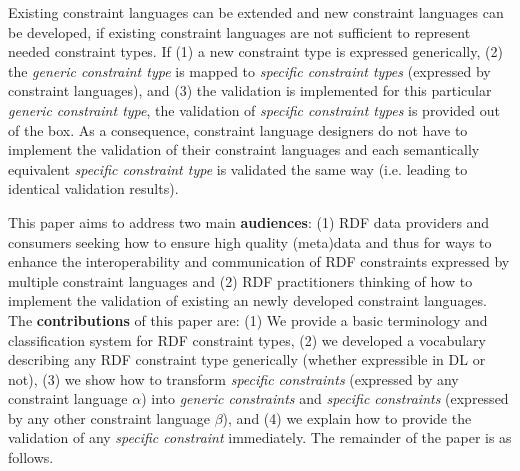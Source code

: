 \documentclass{llncs}
\newcommand{\ms}[1]{\texttt{#1}}
\begin{document}

Existing constraint languages can be extended and new constraint languages can be developed, if existing constraint languages are not sufficient to represent needed constraint types.
If (1) a new constraint type is expressed generically, (2) the \emph{generic constraint type} is mapped to \emph{specific constraint types} (expressed by constraint languages), and (3) the validation is implemented for this particular \emph{generic constraint type},
the validation of \emph{specific constraint types} is provided out of the box.
As a consequence, constraint language designers do not have to implement the validation of their constraint languages and each semantically equivalent \emph{specific constraint type} is validated the same way (i.e. leading to identical validation results).

This paper aims to address two main \textbf{audiences}:
(1) RDF data providers and consumers seeking how to ensure high quality (meta)data and thus for ways to enhance the interoperability and communication of RDF constraints expressed by multiple constraint languages and  
(2) RDF practitioners thinking of how to implement the validation of existing an newly developed constraint languages.
The \textbf{contributions} of this paper are:
(1) We provide a basic terminology and classification system for RDF constraint types,
(2) we developed a vocabulary describing any RDF constraint type generically (whether expressible in DL or not),
(3) we show how to transform \emph{specific constraints} (expressed by any constraint language \ms{$\alpha$}) into \emph{generic constraints} and \emph{specific constraints} (expressed by any other constraint language \ms{$\beta$}), and
(4) we explain how to provide the validation of any \emph{specific constraint} immediately. 
The remainder of the paper is as follows.
\end{document}
